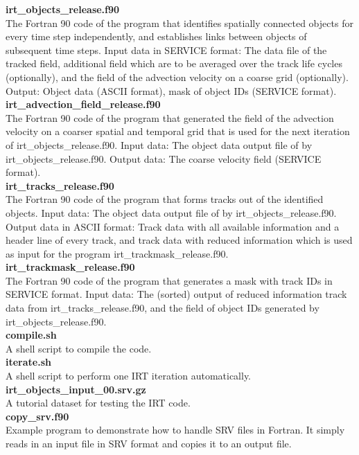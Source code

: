 \documentclass[11pt]{article}
\begin{document}
{\bf irt\_objects\_release.f90}\\
The Fortran 90 code of the program that identifies spatially connected objects for every time step independently, and establishes links between objects of subsequent time steps. Input data in SERVICE format: The data file of the tracked field, additional field which are to be averaged over the track life cycles (optionally), and the field of the advection velocity on a coarse grid (optionally). Output: Object data (ASCII format), mask of object IDs (SERVICE format). \vspace{0.5cm} \\
{\bf irt\_advection\_field\_release.f90}\\
The Fortran 90 code of the program that generated the field of the advection velocity on a coarser spatial and temporal grid that is used for the next iteration of irt\_objects\_release.f90. Input data: The object data output file of by irt\_objects\_release.f90. Output data: The coarse velocity field (SERVICE format). \vspace{0.5cm} \\
{\bf irt\_tracks\_release.f90}\\
The Fortran 90 code of the program that forms tracks out of the identified objects. Input data: The object data output file of by irt\_objects\_release.f90. Output data in ASCII format: Track data with all available information and a header line of every track, and track data with reduced information which is used as input for the program irt\_trackmask\_release.f90. \vspace{0.5cm} \\
{\bf irt\_trackmask\_release.f90}\\
The Fortran 90 code of the program that generates a mask with track IDs in SERVICE format. Input data: The (sorted) output of reduced information track data from irt\_tracks\_release.f90, and the field of object IDs generated by irt\_objects\_release.f90. \vspace{0.5cm} \\
{\bf compile.sh}\\
A shell script to compile the code. \vspace{0.5cm} \\
{\bf iterate.sh}\\
A shell script to perform one IRT iteration automatically. \vspace{0.5cm} \\
{\bf irt\_objects\_input\_00.srv.gz}\\
A tutorial dataset for testing the IRT code. \vspace{0.5cm} \\
{\bf copy\_srv.f90}\\
Example program to demonstrate how to handle SRV files in Fortran. It simply reads in an input file in SRV format and copies it to an output file.
\end{document}
